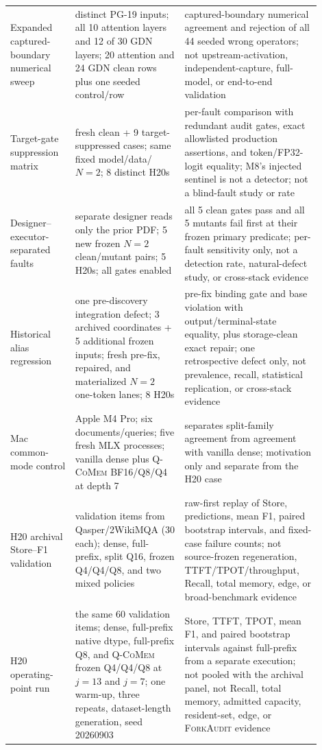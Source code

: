 \documentclass{article}
\newcommand{\qcomem}{\textsc{Q-CoMem}}
\newcommand{\method}{\textsc{ForkAudit}}
\begin{document}
\begin{longtable}{@{}>{\raggedright\arraybackslash}p{0.19\linewidth}>{\raggedright\arraybackslash}p{0.32\linewidth}>{\raggedright\arraybackslash}p{0.39\linewidth}@{}}
  Expanded captured-boundary numerical sweep & 2 distinct PG-19 inputs; all 10 attention layers and 12 of 30 GDN layers; 20 attention and 24 GDN clean rows plus one seeded control/row & captured-boundary numerical agreement and rejection of all 44 seeded wrong operators; not upstream-activation, independent-capture, full-model, or end-to-end validation \\
  Target-gate suppression matrix & 9 fresh clean + 9 target-suppressed cases; same fixed model/data/$N=2$; 8 distinct H20s & per-fault comparison with redundant audit gates, exact allowlisted production assertions, and token/FP32-logit equality; M8's injected sentinel is not a detector; not a blind-fault study or rate \\
  Designer--executor-separated faults & separate designer reads only the prior PDF; 5 new frozen $N=2$ clean/mutant pairs; 5 H20s; all gates enabled & all 5 clean gates pass and all 5 mutants fail first at their frozen primary predicate; per-fault sensitivity only, not a detection rate, natural-defect study, or cross-stack evidence \\
  Historical alias regression & one pre-discovery integration defect; 3 archived coordinates + 5 additional frozen inputs; fresh pre-fix, repaired, and materialized $N=2$ one-token lanes; 8 H20s & pre-fix binding gate and base violation with output/terminal-state equality, plus storage-clean exact repair; one retrospective defect only, not prevalence, recall, statistical replication, or cross-stack evidence \\
  Mac common-mode control & Apple M4 Pro; six documents/queries; five fresh MLX processes; vanilla dense plus \qcomem{} BF16/Q8/Q4 at depth 7 & separates split-family agreement from agreement with vanilla dense; motivation only and separate from the H20 case \\
  H20 archival Store--F1 validation & 60 validation items from Qasper/2WikiMQA (30 each); dense, full-prefix, split Q16, frozen Q4/Q4/Q8, and two mixed policies & raw-first replay of Store, predictions, mean F1, paired bootstrap intervals, and fixed-case failure counts; not source-frozen regeneration, TTFT/TPOT/throughput, Recall, total memory, edge, or broad-benchmark evidence \\
  H20 operating-point run & the same 60 validation items; dense, full-prefix native dtype, full-prefix Q8, and \qcomem{} frozen Q4/Q4/Q8 at $j=13$ and $j=7$; one warm-up, three repeats, dataset-length generation, seed 20260903 & Store, TTFT, TPOT, mean F1, and paired bootstrap intervals against full-prefix from a separate execution; not pooled with the archival panel, not Recall, total memory, admitted capacity, resident-set, edge, or \method{} evidence \\

\end{longtable}
\end{document}
